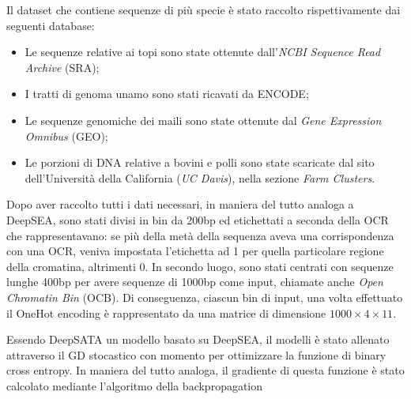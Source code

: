 Il dataset che contiene sequenze di più specie è stato raccolto rispettivamente dai seguenti database:
\begin{itemize}
    \item Le sequenze relative ai topi sono state ottenute dall'\textit{\acs{NCBI} Sequence Read Archive} (\acs{SRA});
    \item I tratti di genoma unamo sono stati ricavati da \acs{ENCODE};
    \item Le sequenze genomiche dei maili sono state ottenute dal \textit{Gene Expression Omnibus} (\acs{GEO});
    \item Le porzioni di \acs{DNA} relative a bovini e polli sono state scaricate dal sito dell'Università della California (\textsl{UC Davis}), nella sezione \textit{Farm Clusters}.
\end{itemize} 
% 
\noindent Dopo aver raccolto tutti i dati necessari, in maniera del tutto analoga a DeepSEA, sono stati divisi in bin da 200bp ed etichettati a seconda della \acs{OCR} che rappresentavano: se più della metà della sequenza aveva una corrispondenza con una \acs{OCR}, veniva impostata l'etichetta ad 1 per quella particolare regione della cromatina, altrimenti 0. In secondo luogo, sono stati centrati con sequenze lunghe 400bp per avere sequenze di 1000bp come input, chiamate anche \textit{Open Chromatin Bin} (\acs{OCB}). Di conseguenza, ciascun bin di input, una volta effettuato il OneHot encoding è rappresentato da una matrice di dimensione $1000 \times 4 \times 11$.

Essendo DeepSATA un modello basato su DeepSEA, il modelli è stato allenato attraverso il \acs{GD} stocastico con momento per ottimizzare la funzione di binary cross entropy. In maniera del tutto analoga, il gradiente di questa funzione è stato calcolato mediante l'algoritmo della backpropagation

